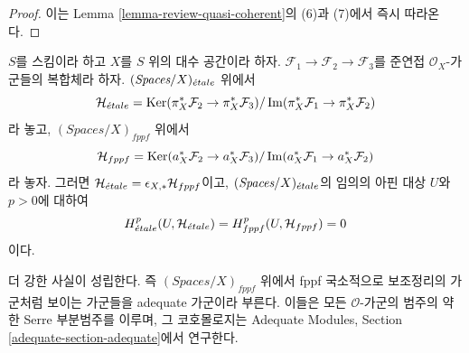 \begin{proof}
이는 Lemma \ref{lemma-review-quasi-coherent}의 (6)과 (7)에서
즉시 따라온다.
\end{proof}

\begin{lemma}
\label{lemma-vanishing-adequate}
$S$를 스킴이라 하고 $X$를 $S$ 위의 대수 공간이라 하자.
$\mathcal{F}_1 \to \mathcal{F}_2 \to \mathcal{F}_3$를 준연접
$\mathcal{O}_X$-가군들의 복합체라 하자.
$(\textit{Spaces}/X)_{\acute{e}tale}$ 위에서
$$
\mathcal{H}_{\acute{e}tale} =
\mathop{\mathrm{Ker}}(\pi_X^*\mathcal{F}_2 \to \pi_X^*\mathcal{F}_3)/
\mathop{\mathrm{Im}}(\pi_X^*\mathcal{F}_1 \to \pi_X^*\mathcal{F}_2)
$$
라 놓고, $(\textit{Spaces}/X)_{fppf}$ 위에서
$$
\mathcal{H}_{fppf} =
\mathop{\mathrm{Ker}}(a_X^*\mathcal{F}_2 \to a_X^*\mathcal{F}_3)/
\mathop{\mathrm{Im}}(a_X^*\mathcal{F}_1 \to a_X^*\mathcal{F}_2)
$$
라 놓자. 그러면
$\mathcal{H}_{\acute{e}tale} = \epsilon_{X, *}\mathcal{H}_{fppf}$이고,
$(\textit{Spaces}/X)_{\acute{e}tale}$의 임의의 아핀 대상 $U$와 $p > 0$에 대하여
$$
H^p_{\acute{e}tale}(U, \mathcal{H}_{\acute{e}tale}) = H^p_{fppf}(U, \mathcal{H}_{fppf}) = 0
$$
이다.
\end{lemma}

\noindent
더 강한 사실이 성립한다. 즉 $(\textit{Spaces}/X)_{fppf}$ 위에서
fppf 국소적으로 보조정리의 가군처럼 보이는 가군들을 adequate
가군이라 부른다.
이들은 모든 $\mathcal{O}$-가군의 범주의 약한 Serre 부분범주를 이루며,
그 코호몰로지는 Adequate Modules, Section
\ref{adequate-section-adequate}에서 연구한다.


